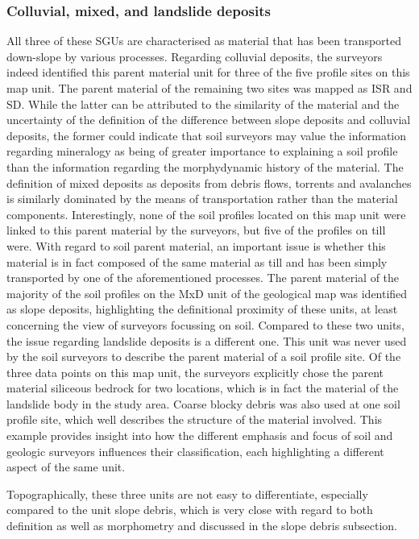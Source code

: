\documentclass[preprint,12pt,authoryear]{elsarticle}
\begin{document}
\subsubsection{Colluvial, mixed, and landslide deposits}
All three of these SGUs are characterised as material that has been transported down-slope by various processes. Regarding colluvial deposits, the surveyors indeed identified this parent material unit for three of the five profile sites on this map unit. The parent material of the remaining two sites was mapped as ISR and SD. While the latter can be attributed to the similarity of the material and the uncertainty of the definition of the difference between slope deposits and colluvial deposits, the former could indicate that  soil surveyors may value the information regarding mineralogy as being of greater importance to explaining a soil profile than the information regarding the morphydynamic history of the material. The definition of mixed deposits as deposits from debris flows, torrents and avalanches is similarly dominated by the means of transportation rather than the material components. Interestingly, none of the soil profiles located on this map unit were linked to this parent material by the surveyors, but five of the profiles on till were. With regard to soil parent material, an important issue is whether this material is in fact composed of the same material as till and has been simply transported by one of the aforementioned processes. The parent material of the majority of the soil profiles on the  MxD unit of the geological map was identified as slope deposits, highlighting the definitional proximity of these units, at least concerning the view of surveyors focussing on soil. Compared to these two units, the issue regarding landslide deposits is a different one. This unit was never used by the soil surveyors to describe the parent material of a soil profile site. Of the three data points on this map unit, the surveyors explicitly chose the parent material siliceous bedrock for two locations, which is in fact the material of the landslide body in the study area. Coarse blocky debris was also used at one soil profile site, which well describes the structure of the material involved. This example provides insight into how the different emphasis and focus of soil and geologic surveyors influences their classification, each highlighting a different aspect of the same unit.

Topographically, these three units are not easy to differentiate, especially compared to the unit slope debris, which is very close with regard to both definition as well as morphometry and discussed in the slope debris subsection.
\end{document}
